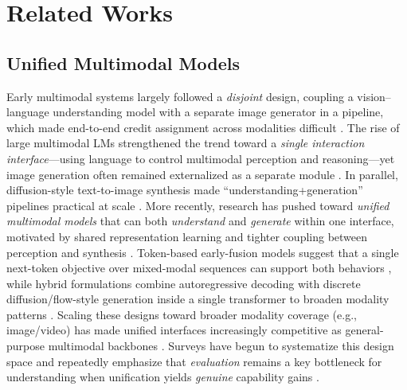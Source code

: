 \documentclass{article}
\theoremstyle{plain}
\theoremstyle{definition}
\theoremstyle{remark}
\begin{document}
\section{Related Works}



\subsection{Unified Multimodal Models}
Early multimodal systems largely followed a \emph{disjoint} design, coupling a vision--language understanding model with a separate image generator in a pipeline, which made end-to-end credit assignment across modalities difficult \citep{alayrac2022flamingo,li2023blip2}.
The rise of large multimodal LMs strengthened the trend toward a \emph{single interaction interface}---using language to control multimodal perception and reasoning---yet image generation often remained externalized as a separate module \citep{huang2023kosmos1}.
In parallel, diffusion-style text-to-image synthesis made ``understanding+generation'' pipelines practical at scale \citep{rombach2022ldm}.
More recently, research has pushed toward \emph{unified multimodal models} that can both \emph{understand} and \emph{generate} within one interface, motivated by shared representation learning and tighter coupling between perception and synthesis \citep{team2024chameleon,xie2024showo}.
Token-based early-fusion models suggest that a single next-token objective over mixed-modal sequences can support both behaviors \citep{team2024chameleon}, while hybrid formulations combine autoregressive decoding with discrete diffusion/flow-style generation inside a single transformer to broaden modality patterns \citep{xie2024showo}.
Scaling these designs toward broader modality coverage (e.g., image/video) has made unified interfaces increasingly competitive as general-purpose multimodal backbones \citep{xie2025showo2,deng2025bagel,chen2025januspro}.
Surveys have begun to systematize this design space and repeatedly emphasize that \emph{evaluation} remains a key bottleneck for understanding when unification yields \emph{genuine} capability gains \citep{yang2025survey,zhao2025unifiedsurvey}.
\end{document}
